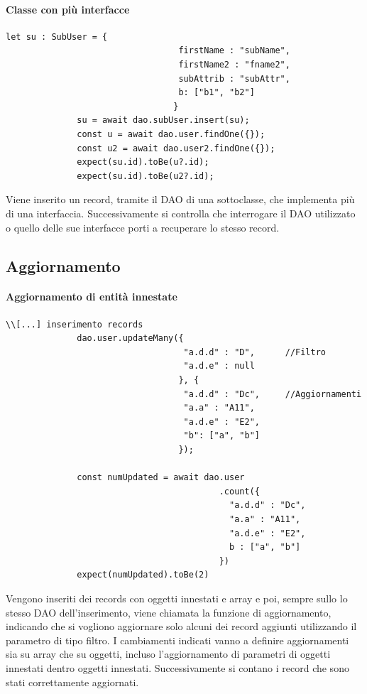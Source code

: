 \documentclass[a4paper, 12pt]{report}
\begin{document}
          \paragraph{Classe con più interfacce}
            \begin{Verbatim}[samepage=true]
              let su : SubUser = {
                                  firstName : "subName",
                                  firstName2 : "fname2",
                                  subAttrib : "subAttr",
                                  b: ["b1", "b2"]
                                 }
              su = await dao.subUser.insert(su);
              const u = await dao.user.findOne({});
              const u2 = await dao.user2.findOne({});
              expect(su.id).toBe(u?.id);
              expect(su.id).toBe(u2?.id);
            \end{Verbatim}
            Viene inserito un record, tramite il DAO di una sottoclasse, che implementa più di una interfaccia. Successivamente si controlla che interrogare il DAO utilizzato o quello delle sue interfacce porti a recuperare lo stesso record.
          \newpage
        \subsection{Aggiornamento}
          \paragraph{Aggiornamento di entità innestate}
            \begin{Verbatim}[samepage=true]
              \\[...] inserimento records
              dao.user.updateMany({
                                   "a.d.d" : "D",      //Filtro
                                   "a.d.e" : null
                                  }, {
                                   "a.d.d" : "Dc",     //Aggiornamenti
                                   "a.a" : "A11",
                                   "a.d.e" : "E2",
                                   "b": ["a", "b"]
                                  });

              const numUpdated = await dao.user
                                          .count({
                                            "a.d.d" : "Dc",
                                            "a.a" : "A11",
                                            "a.d.e" : "E2",
                                            b : ["a", "b"]
                                          })
              expect(numUpdated).toBe(2)
            \end{Verbatim}
            Vengono inseriti dei records con oggetti innestati e array e poi, sempre sullo lo stesso DAO dell'inserimento, viene chiamata la funzione di aggiornamento, indicando che si vogliono aggiornare solo alcuni dei record aggiunti utilizzando il parametro di tipo filtro.
            I cambiamenti indicati vanno a definire aggiornamenti sia su array che su oggetti, incluso l'aggiornamento di parametri di oggetti innestati dentro oggetti innestati.
            Successivamente si contano i record che sono stati correttamente aggiornati.
          \newpage
\end{document}
